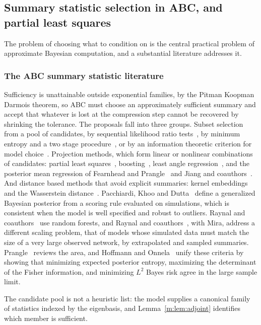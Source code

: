 \subsection{Summary statistic selection in ABC, and partial least squares}\label{m:sec:abcpls}

The problem of choosing what to condition on is the central practical problem of approximate Bayesian computation, and a substantial literature addresses it.

\subsubsection{The ABC summary statistic literature} Sufficiency is unattainable outside exponential families, by the Pitman Koopman Darmois theorem, so ABC must choose an approximately sufficient summary and accept that whatever is lost at the compression step cannot be recovered by shrinking the tolerance. The proposals fall into three groups. Subset selection from a pool of candidates, by sequential likelihood ratio tests~\cite{joycemarjoram2008}, by minimum entropy and a two stage procedure~\cite{nunesbalding2010}, or by an information theoretic criterion for model choice~\cite{barnes2012}. Projection methods, which form linear or nonlinear combinations of candidates: partial least squares~\cite{wegmann2009}, boosting~\cite{aeschbacher2012}, least angle regression~\cite{sedkipudlo2012}, and the posterior mean regression of Fearnhead and Prangle~\cite{fearnheadprangle2012} and Jiang and coauthors~\cite{jiang2017}. And distance based methods that avoid explicit summaries: kernel embeddings~\cite{park2016} and the Wasserstein distance~\cite{bernton2019}. Pacchiardi, Khoo and Dutta~\cite{pacchiardi2024} define a generalized Bayesian posterior from a scoring rule evaluated on simulations, which is consistent when the model is well specified and robust to outliers. Raynal and coauthors~\cite{raynal2019} use random forests, and Raynal and coauthors~\cite{raynal2022}, with Mira, address a different scaling problem, that of models whose simulated data must match the size of a very large observed network, by extrapolated and sampled summaries. Prangle~\cite{prangle2018} reviews the area, and Hoffmann and Onnela~\cite{hoffmannonnela2026} unify these criteria by showing that minimizing expected posterior entropy, maximizing the determinant of the Fisher information, and minimizing $L^2$ Bayes risk agree in the large sample limit.

The candidate pool is not a heuristic list: the model supplies a canonical family of statistics indexed by the eigenbasis, and Lemma~\ref{m:lem:adjoint} identifies which member is sufficient.

